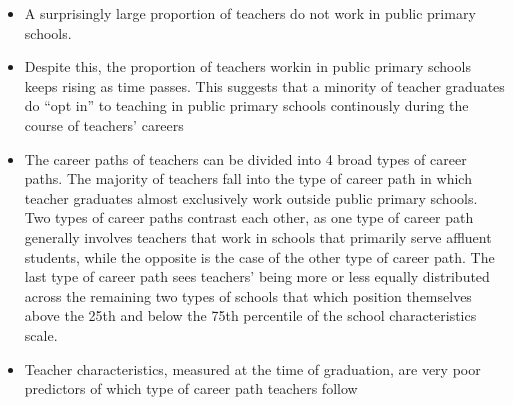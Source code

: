 \documentclass[
]{article}
\begin{document}
\begin{itemize}
\item
  A surprisingly large proportion of teachers do not work in public primary schools.
\item
  Despite this, the proportion of teachers workin in public primary schools keeps rising as time passes. This suggests that a minority of teacher graduates do ``opt in'' to teaching in public primary schools continously during the course of teachers' careers
\item
  The career paths of teachers can be divided into 4 broad types of career paths. The majority of teachers fall into the type of career path in which teacher graduates almost exclusively work outside public primary schools. Two types of career paths contrast each other, as one type of career path generally involves teachers that work in schools that primarily serve affluent students, while the opposite is the case of the other type of career path. The last type of career path sees teachers' being more or less equally distributed across the remaining two types of schools that which position themselves above the 25th and below the 75th percentile of the school characteristics scale.
\item
  Teacher characteristics, measured at the time of graduation, are very poor predictors of which type of career path teachers follow
\end{itemize}
\end{document}
